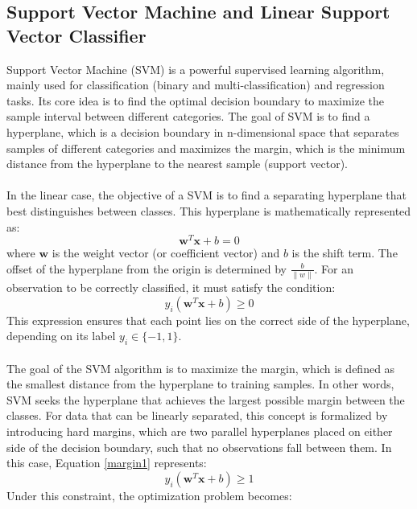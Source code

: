 \subsection{Support Vector Machine and Linear Support Vector Classifier}\label{subsec:SVM}
Support Vector Machine (SVM) is a powerful supervised learning algorithm, mainly used for classification (binary and multi-classification) and regression tasks. Its core idea is to find the optimal decision boundary to maximize the sample interval between different categories. The goal of SVM is to find a hyperplane, which is a decision boundary in n-dimensional space that separates samples of different categories and maximizes the margin, which is the minimum distance from the hyperplane to the nearest sample (support vector).\\
\\
In the linear case, the objective of a SVM is to find a separating hyperplane that best distinguishes between classes. This hyperplane is mathematically represented as:\\
\begin{equation}
	\mathbf{w}^T\mathbf{x}+b=0
\end{equation}
where $\mathbf{w}$ is the weight vector (or coefficient vector) and $b$ is the shift term. The offset of the hyperplane from the origin is determined by $\frac{b}{\|w\|}$. For an observation to be correctly classified, it must satisfy the condition:\\
\begin{equation}
	y_i(\mathbf{w}^T\mathbf{x}+b) \geq0
	\label{margin1}
\end{equation}
This expression ensures that each point lies on the correct side of the hyperplane, depending on its label $y_i \in \{-1,1\}$.\\
\\
The goal of the SVM algorithm is to maximize the margin, which is defined as the smallest distance from the hyperplane to training samples. In other words, SVM seeks the hyperplane that achieves the largest possible margin between the classes. For data that can be linearly separated, this concept is formalized by introducing hard margins, which are two parallel hyperplanes placed on either side of the decision boundary, such that no observations fall between them. In this case, Equation \eqref{margin1} represents:
\begin{equation}
		y_i(\mathbf{w}^T\mathbf{x}+b) \geq 1
\end{equation}
Under this constraint, the optimization problem becomes:\\
